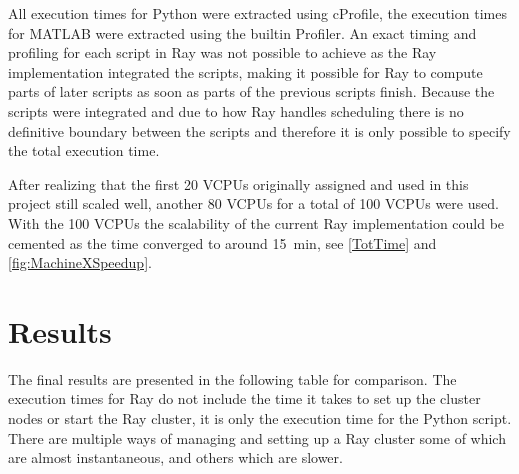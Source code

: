 \documentclass[12pt, a4paper]{article}
\begin{document}
All execution times for Python were extracted using cProfile, the execution times for MATLAB were extracted using the builtin Profiler.
An exact timing and profiling for each script in Ray was not possible to achieve as the Ray implementation integrated the scripts, making it possible for Ray to compute parts of later scripts as soon as parts of the previous scripts finish.
Because the scripts were integrated and due to how Ray handles scheduling there is no definitive boundary between the scripts and therefore it is only possible to specify the total execution time.

After realizing that the first 20 VCPUs originally assigned and used in this project still scaled well, another 80 VCPUs for a total of 100 VCPUs were used. With the 100 VCPUs the scalability of the current Ray implementation could be cemented as the time converged to around \SI{15}{\minute}, see \cref{TotTime} and \cref{fig:MachineXSpeedup}.

\section{Results}

The final results are presented in the following table for comparison.
The execution times for Ray do not include the time it takes to set up the cluster nodes or start the Ray cluster, it is only the execution time for the Python script.
There are multiple ways of managing and setting up a Ray cluster some of which are almost instantaneous, and others which are slower. 
\end{document}
